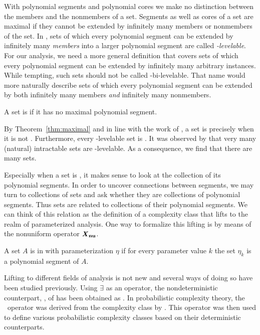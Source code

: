 With polynomial segments and polynomial cores we make no distinction between the members and the nonmembers of a set.
Segments as well as cores of a set are maximal if they cannot be extended by infinitely many members or nonmembers of the set.
In \parencite{orponen1985polynomial,orponen1986optimal}, sets of which every polynomial segment can be extended by infinitely many \emph{members} into a larger polynomial segment are called \emph{-levelable}.
For our analysis, we need a more general definition that covers sets of which every polynomial segment can be extended by infinitely many arbitrary instances.
While tempting, such sets should not be called -bi-levelable.
That name would more naturally describe sets of which every polynomial segment can be extended by both infinitely many members \emph{and} infinitely many nonmembers.
\begin{definition}
  A set is  if it has no maximal polynomial segment.
\end{definition}
By Theorem~\ref{thm:maximal} and in line with the work of \textcite{orponen1985polynomial}, a set is  precisely when it is not .
Furthermore, every -levelable set is .
It was observed by \textcite{orponen1986optimal} that very many (natural) intractable sets are -levelable.
As a consequence, we find that there are many  sets.

Especially when a set is , it makes sense to look at the collection of its polynomial segments.
In order to uncover connections between segments, we may turn to collections of sets and ask whether they are collections of polynomial segments.
Thus sets are related to collections of their polynomial segments.
We can think of this relation as the definition of a complexity class that lifts  to the realm of parameterized analysis.
One way to formalize this lifting is by means of the nonuniform operator $\textnormal{\textbf{\textit{X}$_\textbf{nu}$}}$.
\begin{definition}
  A set $A$ is in  with parameterization $\eta$ if for every parameter value $k$ the set $\eta_k$ is a polynomial segment of $A$.
\end{definition}

Lifting  to different fields of analysis is not new and several ways of doing so have been studied previously.
Using $\exists$ as an operator, the nondeterministic counterpart, , of  has been obtained as .
In probabilistic complexity theory, the ~operator was derived from the complexity class  by \textcite{schoning1989probabilistic}.
This operator was then used to define various probabilistic complexity classes based on their deterministic counterparts.

